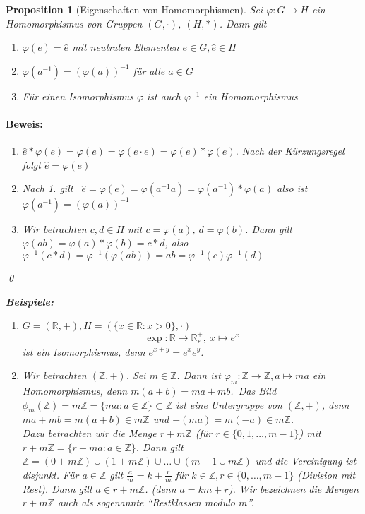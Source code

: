 \documentclass{report}
\newcommand{\R}{\mathbb{R}}
\newcommand{\Z}{\mathbb{Z}}
\theoremstyle{customrem}
\theoremstyle{customdef}
\newtheorem{proposition}[definition]{Proposition}
\renewenvironment{proof}{\paragraph{Beweis: }}{\qed}
\theoremstyle{customenv}
\begin{document}
	\begin{proposition}[Eigenschaften von Homomorphismen]
		Sei \(\varphi : G \to H\) ein Homomorphismus von Gruppen \((G, \cdot)\), \((H, \ast)\). Dann gilt
		\begin{enumerate}
			\itemsep0cm
			\item \(\varphi(e) = \hat{e}\) mit neutralen Elementen \(e \in G, \hat{e} \in H\)
			\item \(\varphi(a^{-1}) = (\varphi(a))^{-1}\) für alle \(a \in G\)
			\item Für einen Isomorphismus \(\varphi\) ist auch \(\varphi^{-1}\) ein Homomorphismus
		\end{enumerate}
		\begin{proof}
			\begin{enumerate}
				\item \(\hat{e} * \varphi(e) = \varphi(e) = \varphi(e \cdot e) = \varphi(e) * \varphi(e)\). Nach der Kürzungsregel folgt \(\hat{e} = \varphi(e)\)
				\item Nach 1. gilt \ \(\hat{e} = \varphi(e) = \varphi(a^{-1} a) = \varphi(a^{-1}) * \varphi(a)\) also ist \(\varphi(a^{-1}) = (\varphi(a))^{-1}\)				
				\item Wir betrachten \(c, d \in H\) mit \(c = \varphi(a)\), \(d = \varphi(b)\). Dann gilt \(\varphi(a b) = \varphi(a) * \varphi(b) = c * d\), also \(\varphi^{-1}(c * d) = \varphi^{-1}(\varphi(a b)) = ab = \varphi^{-1}(c) \varphi^{-1}(d)\)
			\end{enumerate}	
		\end{proof}
		
		\textbf{Beispiele:}
		\begin{enumerate}
			\item \(G = (\R, +), H = (\{x \in \R : x > 0\}, \cdot)\)
			\[\exp : \R \to \R^+_*,\ x \mapsto e^x\]
			ist ein Isomorphismus, denn \(e^{x + y} = e^x e^y\).
			\item Wir betrachten \((\Z, +)\). Sei \(m \in \Z\). Dann ist \(\varphi_m : \Z \to \Z, a \mapsto ma\) ein Homomorphismus, denn \(m(a + b) = ma + mb\).\ Das Bild \(\phi_m(\Z) = m\Z = \{m a : a \in \Z\} \subset \Z\)  ist eine Untergruppe von \((\Z, +)\), denn \(ma + mb = m(a + b) \in m\Z\) und \(-(ma) = m(-a) \in m\Z\).\\	
			
			Dazu betrachten wir die Menge \(r + m\Z\) (für \(r \in \{0, 1, \dots, m-1\}\)) mit \(r + m\Z = \{r+ma : a \in \Z\}\). Dann gilt \(\Z = (0 +m\Z) \cup (1 + m\Z) \cup \dots \cup(m-1 \cup m\Z)\) und die Vereinigung ist disjunkt.	Für \(a \in \Z\) gilt \(\frac{a}{m} = k + \frac{r}{m}\) für \(k \in \Z, r \in \{0, \dots, m-1\}\) (Division mit Rest). Dann gilt \( a \in r + m\Z\). (denn \(a = km + r\)). Wir bezeichnen die Mengen \(r + m\Z\) auch als sogenannte "`\textit{Restklassen modulo \(m\)}"'.\\
			

\end{enumerate}
\end{proposition}
\end{document}
